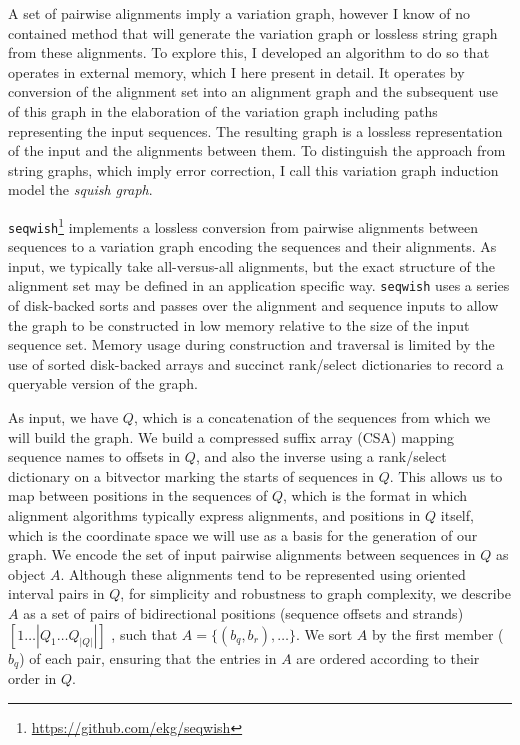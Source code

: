 \documentclass[a4paper,12pt,numbered,oneside]{Classes/PhDThesisPSnPDF}
\begin{document}
A set of pairwise alignments imply a variation graph, however I know of no contained method that will generate the variation graph or lossless string graph from these alignments.
To explore this, I developed an algorithm to do so that operates in external memory, which I here present in detail.
It operates by conversion of the alignment set into an alignment graph and the subsequent use of this graph in the elaboration of the variation graph including paths representing the input sequences.
The resulting graph is a lossless representation of the input and the alignments between them.
To distinguish the approach from string graphs, which imply error correction, I call this variation graph induction model the \emph{squish graph}.

{\tt seqwish}\footnote{\url{https://github.com/ekg/seqwish}} implements a lossless conversion from pairwise alignments between sequences to a variation graph encoding the sequences and their alignments.
As input, we typically take all-versus-all alignments, but the exact structure of the alignment set may be defined in an application specific way.
{\tt seqwish} uses a series of disk-backed sorts and passes over the alignment and sequence inputs to allow the graph to be constructed in low memory relative to the size of the input sequence set.
Memory usage during construction and traversal is limited by the use of sorted disk-backed arrays and succinct rank/select dictionaries to record a queryable version of the graph.


As input, we have $Q$, which is a concatenation of the sequences from which we will build the graph.
We build a compressed suffix array (CSA) mapping sequence names to offsets in $Q$, and also the inverse using a rank/select dictionary on a bitvector marking the starts of sequences in $Q$.
This allows us to map between positions in the sequences of $Q$, which is the format in which alignment algorithms typically express alignments, and positions in $Q$ itself, which is the coordinate space we will use as a basis for the generation of our graph.
We encode the set of input pairwise alignments between sequences in $Q$ as object $A$.
Although these alignments tend to be represented using oriented interval pairs in $Q$, for simplicity and robustness to graph complexity, we describe $A$ as a set of pairs of bidirectional positions (sequence offsets and strands) $[1 \ldots |Q_1 \ldots Q_{|Q|}|]$ , such that $A = \{ (b_{q}, b_{r}), \ldots \}$.
We sort $A$ by the first member ($b_{q}$) of each pair, ensuring that the entries in $A$ are ordered according to their order in $Q$.
\end{document}
